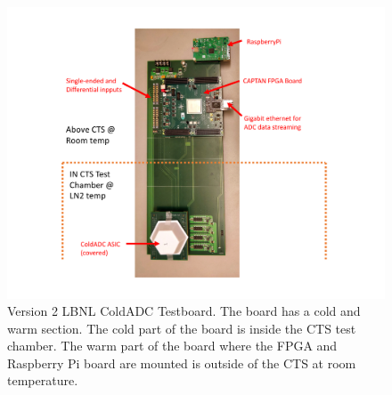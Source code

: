 \begin{figure}[!ht]
\centering
 \includegraphics[width=1.0\linewidth]{figures/prakash_fig/TestBoard2_CTS.pdf}
  \caption[LBNL ColdADC Testboard]{Version 2 LBNL ColdADC Testboard. The board has a cold and warm section. The
cold part of the board is inside the CTS test chamber. The warm part of the board where the FPGA and Raspberry Pi board are mounted is outside of the CTS at room temperature.}
  \label{fig:v2_board}
\end{figure}



